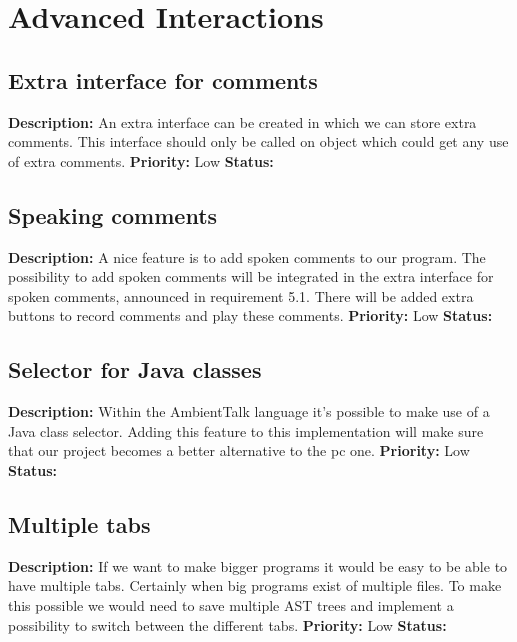 \documentclass[a4paper,12pt]{report}
\begin{document}
\section{Advanced Interactions}
\subsection{Extra interface for comments}
\textbf{Description: } An extra interface can be created in which we can store extra comments. This interface should only be called on object which could get any use of extra comments.
 \newline
\textbf{Priority:} Low \newline
\textbf{Status: } \newline
\subsection{Speaking comments}
\textbf{Description: } A nice feature is to add spoken comments to our program. The possibility to add spoken comments will be integrated in the
extra interface for spoken comments, announced in requirement 5.1. There will be added extra buttons to record comments and play these comments.\newline
\textbf{Priority:} Low \newline
\textbf{Status: } \newline
\subsection{Selector for Java classes}
\textbf{Description: } Within the AmbientTalk language it's possible to make use of a Java class selector. Adding this feature to this implementation
will make sure that our project becomes a better alternative to the pc one.\newline
\textbf{Priority:} Low \newline
\textbf{Status: } \newline
\subsection{Multiple tabs}
\textbf{Description: } If we want to make bigger programs it would be easy to be able to have multiple tabs. Certainly when big programs exist of multiple files. To make this possible we would need
to save multiple AST trees and implement a possibility to switch between the different tabs.\newline
\textbf{Priority:} Low \newline
\textbf{Status: }
\end{document}
